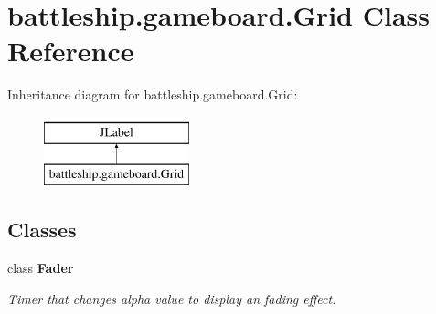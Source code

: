 \hypertarget{classbattleship_1_1gameboard_1_1Grid}{}\section{battleship.\+gameboard.\+Grid Class Reference}
\label{classbattleship_1_1gameboard_1_1Grid}
Inheritance diagram for battleship.\+gameboard.\+Grid\+:\begin{figure}[H]
\begin{center}
\leavevmode
\includegraphics[height=2.000000cm]{classbattleship_1_1gameboard_1_1Grid}
\end{center}
\end{figure}
\subsection*{Classes}
\begin{DoxyCompactItemize}
\item 
class {\bfseries Fader}
\begin{DoxyCompactList}\small\item\em Timer that changes alpha value to display an fading effect. \end{DoxyCompactList}\end{DoxyCompactItemize}
